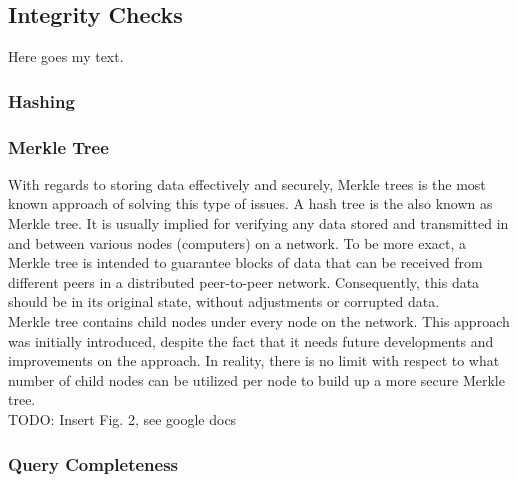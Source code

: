 \subsection{Integrity Checks}

Here goes my text.

\subsubsection{Hashing}
\subsubsection{Merkle Tree}

With regards to storing data effectively and securely, Merkle trees is the most known approach of solving this type of issues. A hash tree is the also known as Merkle tree. It is usually implied for verifying any data stored and transmitted in and between various nodes (computers) on a network. To be more exact, a Merkle tree is intended to guarantee blocks of data that can be received from different peers in a distributed peer-to-peer network. Consequently, this data should be in its original state, without adjustments or corrupted data.\\
Merkle tree contains child nodes under every node on the network. This approach was initially introduced, despite the fact that it needs future developments and improvements on the approach. In reality, there is no limit with respect to what number of child nodes can be utilized per node to build up a more secure Merkle tree.\\
TODO: Insert Fig. 2, see google docs
\subsubsection{Query Completeness}